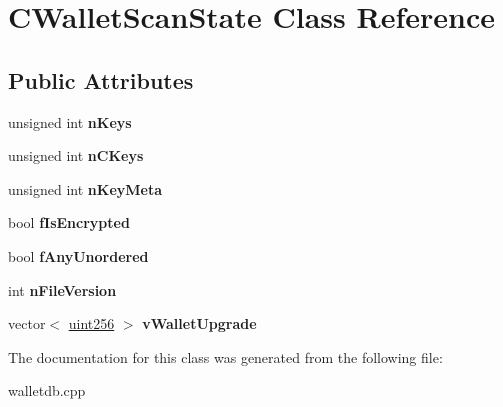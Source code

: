 \hypertarget{class_c_wallet_scan_state}{}\section{C\+Wallet\+Scan\+State Class Reference}
\label{class_c_wallet_scan_state}
\subsection*{Public Attributes}
\begin{DoxyCompactItemize}
\item 
\mbox{\label{class_c_wallet_scan_state_a8a6e0071320cbfffc6d7d49ded5d506e}} 
unsigned int {\bfseries n\+Keys}
\item 
\mbox{\label{class_c_wallet_scan_state_ae1316ee4cfdf8fbff91ca32a5d0f2b6a}} 
unsigned int {\bfseries n\+C\+Keys}
\item 
\mbox{\label{class_c_wallet_scan_state_a2cfbc8894839188b57be22e72f2d6de4}} 
unsigned int {\bfseries n\+Key\+Meta}
\item 
\mbox{\label{class_c_wallet_scan_state_a13c5139c5966079d1be4c739666c5243}} 
bool {\bfseries f\+Is\+Encrypted}
\item 
\mbox{\label{class_c_wallet_scan_state_acafa7b6a27ec1a4714e9a7b331067e9d}} 
bool {\bfseries f\+Any\+Unordered}
\item 
\mbox{\label{class_c_wallet_scan_state_ad68ce61566ee2baf3d7b04b1390942d1}} 
int {\bfseries n\+File\+Version}
\item 
\mbox{\label{class_c_wallet_scan_state_a6cbf626ca5a0275f0469684f22dff12f}} 
vector$<$ \mbox{\hyperlink{classuint256}{uint256}} $>$ {\bfseries v\+Wallet\+Upgrade}
\end{DoxyCompactItemize}


The documentation for this class was generated from the following file\+:\begin{DoxyCompactItemize}
\item 
walletdb.\+cpp\end{DoxyCompactItemize}
